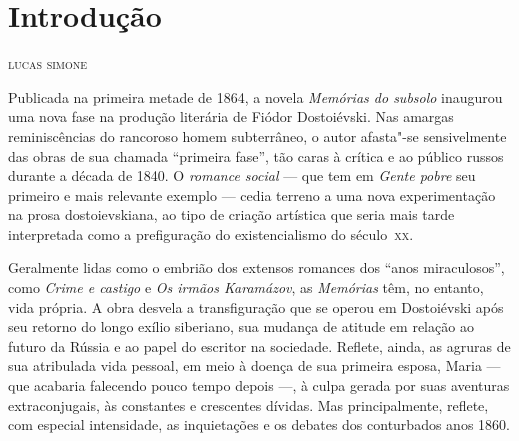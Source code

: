 
\pagestyle{plain}

\chapter*{Introdução\smallskip{}}

\begin{flushright}
\textsc{lucas simone}
\end{flushright}

\noindent{}Publicada na primeira metade de 1864, a novela \textit{Memórias do subsolo}
inaugurou uma nova fase na produção literária de Fiódor Dostoiévski. Nas
amargas reminiscências do rancoroso homem subterrâneo, o autor afasta"-se
sensivelmente das obras de sua chamada ``primeira fase'', tão caras à crítica e
ao público russos durante a década de 1840. O \textit{romance social} --- que tem em
\textit{Gente pobre} seu primeiro e mais relevante exemplo --- cedia terreno a
uma nova experimentação na prosa dostoievskiana, ao tipo de criação artística
que seria mais tarde interpretada como a prefiguração do existencialismo do
século~\textsc{xx}.

Geralmente lidas como o embrião dos extensos romances dos ``anos miraculosos'',
como \textit{Crime e castigo} e \textit{Os irmãos Karamázov}, as
\textit{Memórias} têm, no entanto, vida própria. A obra desvela a
transfiguração que se operou em Dostoiévski após seu retorno do longo exílio
siberiano, sua mudança de atitude em relação ao futuro da Rússia e ao papel do
escritor na sociedade.  Reflete, ainda, as agruras de sua atribulada vida
pessoal, em meio à doença de sua primeira esposa, Maria --- que acabaria falecendo
pouco tempo depois ---, à culpa gerada por suas aventuras extraconjugais, às
constantes e crescentes dívidas. Mas principalmente, reflete, com especial
intensidade, as inquietações e os debates dos conturbados anos 1860.

